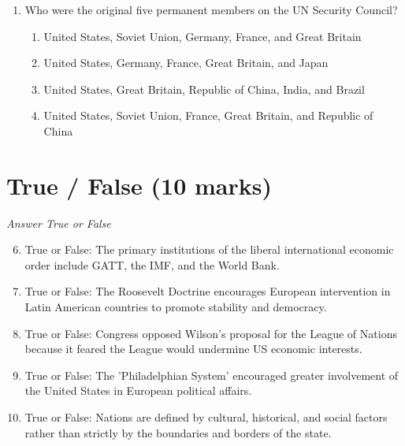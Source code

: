 \documentclass[12pt]{article}
\begin{document}
\begin{enumerate}[label=\arabic*.]
\begin{enumerate}[label=(\alph*)]
    \item Creation of the Department of Homeland Security
    \item Moving the Department of Defense Intelligence Agencies to the CIA for better coordination
    \item Creation of the National Intelligence Director
    \item Moving the domestic intelligence component of the FBI to the CIA
\end{enumerate}
\item Who were the original five permanent members on the UN Security Council?
\begin{enumerate}[label=(\alph*)]
    \item United States, Soviet Union, Germany, France, and Great Britain
    \item United States, Germany, France, Great Britain, and Japan
    \item United States, Great Britain, Republic of China, India, and Brazil
    \item United States, Soviet Union, France, Great Britain, and Republic of China
\end{enumerate}
\end{enumerate}

\section*{True / False (10 marks)}
\textit{Answer True or False}
\begin{enumerate}[label=\arabic*.]
\setcounter{enumi}{5}
\item True or False: The primary institutions of the liberal international economic order include GATT, the IMF, and the World Bank.
\item True or False: The Roosevelt Doctrine encourages European intervention in Latin American countries to promote stability and democracy.
\item True or False: Congress opposed Wilson's proposal for the League of Nations because it feared the League would undermine US economic interests.
\item True or False: The 'Philadelphian System' encouraged greater involvement of the United States in European political affairs.
\item True or False: Nations are defined by cultural, historical, and social factors rather than strictly by the boundaries and borders of the state.
\end{enumerate}
\end{document}
